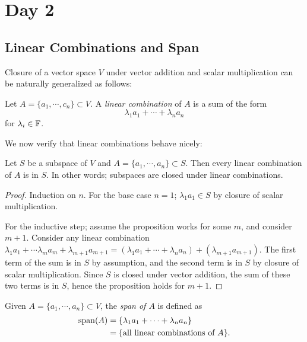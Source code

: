 
\pagebreak
\section{Day 2}

\subsection{Linear Combinations and Span}

Closure of a vector space $V$ under vector addition and scalar multiplication can be naturally generalized as follows:

\begin{definition}
  Let $A=\{a_1,\cdots,c_n\}\subset V$. A \emph{linear combination} of $A$ is a sum of the form
  \[
    \lambda_1 a_1 + \cdots + \lambda_n a_n
  \]
  for $\lambda_i\in\mathbb{F}$.
\end{definition}

We now verify that linear combinations behave nicely:
\begin{proposition}
  Let $S$ be a subspace of $V$ and $A=\{a_1,\cdots,a_n\}\subset S$. Then every linear combination of $A$ is in $S$. In other words; subspaces are closed under linear combinations.
\end{proposition}
\begin{proof}
  Induction on $n$. For the base case $n=1$; $\lambda_1 a_1\in S$ by closure of scalar multiplication.

  For the inductive step; assume the proposition works for some $m$, and consider $m+1$. Consider any linear combination $\lambda_1 a_1 + \cdots \lambda_m a_m + \lambda_{m+1} a_{m+1} = (\lambda_1 a_1 + \cdots + \lambda_n a_n) + (\lambda_{m+1} a_{m+1})$. The first term of the sum is in $S$ by assumption, and the second term is in $S$ by closure of scalar multiplication. Since $S$ is closed under vector addition, the sum of these two terms is in $S$, hence the proposition holds for $m+1$.
\end{proof}

\begin{definition}
  Given $A=\{a_1,\cdots,a_n\}\subset V$, the \emph{span of $A$} is defined as
  \begin{align*}
    \operatorname{span}(A) &= \{\lambda_1 a_1+\cdots+\lambda_n a_n\}\\
      &= \{\text{all linear combinations of } A\}.
  \end{align*}
\end{definition}

